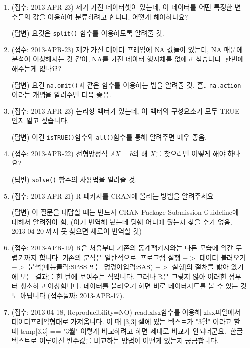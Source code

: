 \documentclass{book}
\begin{document}
\begin{enumerate}
	


	\item (접수: 2013-APR-23)  제가 가진 데이터셋이 있는데, 이 데이터를 어떤 특정한 변수들의 값을 이용하여 분류하려고 합니다.  어떻게 해야하나요?
	
	\textsf{(답변)}  요것은 \texttt{split()} 함수를 이용하도록 알려줄 것. 

	\item (접수: 2013-APR-23) 제가 가진 데이터 프레임에 NA 값들이 있는데, NA 때문에 분석이 이상해지는 것 같아, NA를 가진 데이터 행자체를 없애고 싶습니다.  한번에 해주는게 없나요? 
	
	\textsf{(답변)}  요건 \texttt{na.omit()}과 같은 함수를 이용하는 법을 알려줄 것.  흠.. \texttt{na.action}이라는 개념을 알려주면 더욱 좋음. 

	\item (접수: 2013-APR-23) 논리형 벡터가 있는데, 이 벡터의 구성요소가 모두 TRUE 인지 알고 싶습니다. 
	
	\textsf{(답변)} 이건 \texttt{isTRUE()}함수와 \texttt{all()}함수를 통해 알려주면 매우 좋음.
		
	\item (접수: 2013-APR-22) 선형방정식 $AX=b$의 해 $X$를 찾으려면 어떻게 해야 하나요? 
	
	\textsf{(답변)} \texttt{solve()} 함수의 사용법을 알려줄 것.
	
	\item (접수: 2013-APR-21) R 패키지를 CRAN에 올리는 방법을 알려주세요 
	
	\textsf{(답변)} 이 질문을 대답할 때는 반드시 CRAN Package Submission Guideline에 대해서 알려줘야 함.  (이거 번역해 놨는데 당췌 어디에 뒀는지 찾을 수가 없음, 2013-04-20 까지 못 찾으면 새로이 번역할 것)
	
	\item (접수: 2013-APR-19) R은 처음부터 기존의 통계팩키지와는 다른 모습에 약간 두렵기까지 합니다.  기존의 분석은 일반적으로 $[$프로그램 실행 $->$ 데이터 불러오기 $->$ 분석(메뉴클릭:SPSS 또는 명령어입력:SAS) $->$ 실행$]$의 절차를 밟아 왔기에 모든 결과를 한 번에 보여주는 식입니다. 그러나 R은 그렇지 않아 이러한 점부터 생소하고 이상합니다.  데이터를 불러오기 하면 바로 데이터시트를 볼 수 있는 것도 아닙니다 (접수날짜: 2013-APR-17).

	\item (접수: 2013-04-18, Reproducibility=NO) read.xlsx함수를 이용해 xlsx파일에서 데이터프레임형태로 가져옵니다. 이 때 [3,3] 셀에 있는 텍스트가 "3월" 이라고 할 때 temp[3,3] == "3월" 이렇게 비교하려고 하면 제대로 비교가 안되더군요.. 한글 텍스트로 이루어진 변수값를 비교하는 방법이 어떤게 있는지 궁금합니다.
	

\end{enumerate}
\end{document}
